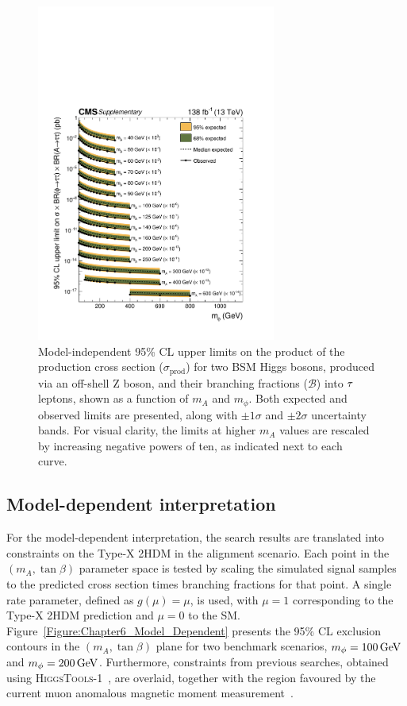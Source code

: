 \begin{figure}[!htbp]
    \centering        
    \includegraphics[width=0.7\textwidth]{Figures/Chapter6/model_independent_limit_all.pdf}
    \caption[Observed and expected 95\% CL upper limits on $\sigma_\text{prod} \times \mathcal{B}(\phi\to\tau\tau)\times\mathcal{B}(A\to\tau\tau)$]{Model-independent 95\% CL upper limits on the product of the production cross section ($\sigma_\text{prod}$) for two BSM Higgs bosons, produced via an off-shell Z boson, and their branching fractions ($\mathcal{B}$) into $\tau$ leptons, shown as a function of $m_A$ and $m_\phi$. Both expected and observed limits are presented, along with $\pm1\sigma$ and $\pm2\sigma$ uncertainty bands. For visual clarity, the limits at higher $m_A$ values are rescaled by increasing negative powers of ten, as indicated next to each curve.}
    \label{Figure:Chapter6_model_independent_all}
\end{figure}

\newpage
\subsection{Model-dependent interpretation}

For the model-dependent interpretation, the search results are translated into constraints on the Type-X 2HDM in the alignment scenario.  Each point in the $(m_A, \tan\beta)$ parameter space is tested by scaling the simulated signal samples to the predicted cross section times branching fractions for that point. A single rate parameter, defined as $g(\mu)=\mu$, is used, with $\mu=1$ corresponding to the Type-X 2HDM prediction and $\mu=0$ to the SM. Figure~\ref{Figure:Chapter6_Model_Dependent} presents the 95\% CL exclusion contours in the $(m_A, \tan\beta)$ plane for two benchmark scenarios, $m_\phi = 100\,\text{Ge\hspace{-.08em}V}$ and $m_\phi = 200\,\text{Ge\hspace{-.08em}V}$. Furthermore, constraints from previous searches, obtained using \textsc{HiggsTools-1}~\cite{Bahl:2022igd}, are overlaid, together with the region favoured by the current muon anomalous magnetic moment measurement~\cite{TypeX_2HDM}.

